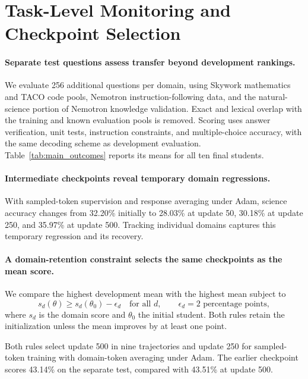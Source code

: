 \section{Task-Level Monitoring and Checkpoint Selection}
\label{sec:recipe}

\paragraph{Separate test questions assess transfer beyond development rankings.}
We evaluate 256 additional questions per domain, using Skywork mathematics and TACO code pools, Nemotron instruction-following data, and the natural-science portion of Nemotron knowledge validation. Exact and lexical overlap with the training and known evaluation pools is removed. Scoring uses answer verification, unit tests, instruction constraints, and multiple-choice accuracy, with the same decoding scheme as development evaluation. Table~\ref{tab:main_outcomes} reports its means for all ten final students.

\paragraph{Intermediate checkpoints reveal temporary domain regressions.}
With sampled-token supervision and response averaging under Adam, science accuracy changes from 32.20\% initially to 28.03\% at update 50, 30.18\% at update 250, and 35.97\% at update 500. Tracking individual domains captures this temporary regression and its recovery.

\paragraph{A domain-retention constraint selects the same checkpoints as the mean score.}
We compare the highest development mean with the highest mean subject to
\begin{equation}
s_d(\theta)\geq s_d(\theta_0)-\epsilon_d\quad\text{for all }d,
\qquad \epsilon_d=2\text{ percentage points},
\label{eq:retention}
\end{equation}
where $s_d$ is the domain score and $\theta_0$ the initial student. Both rules retain the initialization unless the mean improves by at least one point.

Both rules select update 500 in nine trajectories and update 250 for sampled-token training with domain-token averaging under Adam. The earlier checkpoint scores 43.14\% on the separate test, compared with 43.51\% at update 500.

